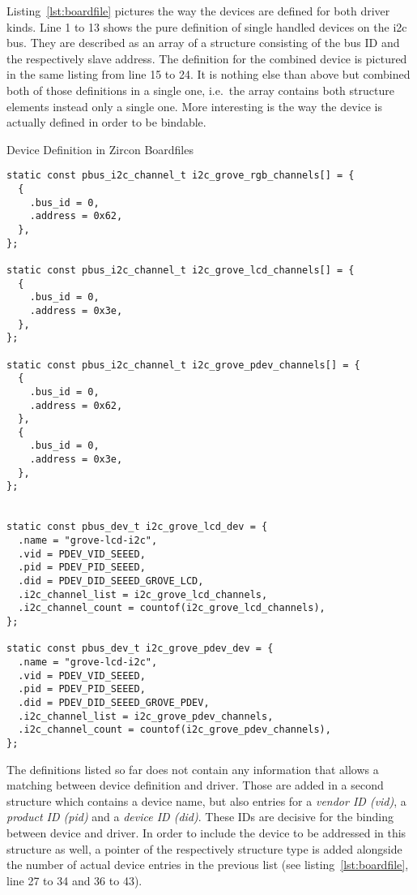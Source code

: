 Listing~\ref{lst:boardfile} pictures the way the devices are defined for both driver kinds.
Line 1 to 13 shows the pure definition of single handled devices on the \ac{i2c} bus.
They are described as an array of a structure consisting of the bus ID and the respectively slave address.
The definition for the combined device is pictured in the same listing from line 15 to 24. 
It is nothing else than above but combined both of those definitions in a single one, i.e.\ the array contains both structure elements instead only a single one.
More interesting is the way the device is actually defined in order to be bindable.
%
\begin{listing} [H]
\caption{Device Definition in Zircon Boardfiles}
\label{lst:boardfile}
\begin{verbatim}
static const pbus_i2c_channel_t i2c_grove_rgb_channels[] = {
  {
    .bus_id = 0,
    .address = 0x62,
  },
};

static const pbus_i2c_channel_t i2c_grove_lcd_channels[] = {
  {
    .bus_id = 0,
    .address = 0x3e,
  },
}; 

static const pbus_i2c_channel_t i2c_grove_pdev_channels[] = {
  {
    .bus_id = 0,
    .address = 0x62,
  },
  {
    .bus_id = 0,
    .address = 0x3e,
  },
};


static const pbus_dev_t i2c_grove_lcd_dev = {
  .name = "grove-lcd-i2c",
  .vid = PDEV_VID_SEEED,              
  .pid = PDEV_PID_SEEED,              
  .did = PDEV_DID_SEEED_GROVE_LCD,    
  .i2c_channel_list = i2c_grove_lcd_channels,
  .i2c_channel_count = countof(i2c_grove_lcd_channels),
}; 

static const pbus_dev_t i2c_grove_pdev_dev = {
  .name = "grove-lcd-i2c",
  .vid = PDEV_VID_SEEED,              
  .pid = PDEV_PID_SEEED,              
  .did = PDEV_DID_SEEED_GROVE_PDEV,  
  .i2c_channel_list = i2c_grove_pdev_channels,
  .i2c_channel_count = countof(i2c_grove_pdev_channels),
};
\end{verbatim}
\end{listing}
%
The definitions listed so far does not contain any information that allows a matching between device definition and driver.
Those are added in a second structure which contains a device name, but also entries for a \textit{vendor ID (vid)}, a \textit{product ID (pid)} and a \textit{device ID (did)}.
These IDs are decisive for the binding between device and driver.
In order to include the device to be addressed in this structure as well, a pointer of the respectively structure type is added alongside the number of actual device entries in the previous list (see listing~\ref{lst:boardfile}, line 27 to 34 and 36 to 43).
